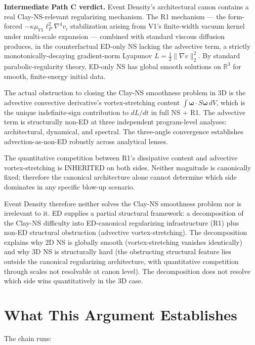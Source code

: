 \documentclass[11pt,a4paper]{article}
\begin{document}
\textbf{Intermediate Path C verdict.} Event Density's architectural canon contains a real Clay-NS-relevant regularizing mechanism. The R1 mechanism --- the form-forced $-\kappa\mu_{V1}\ell_P^2\nabla^4 v_i$ stabilization arising from V1's finite-width vacuum kernel under multi-scale expansion --- combined with standard viscous diffusion produces, in the counterfactual ED-only NS lacking the advective term, a strictly monotonically-decaying gradient-norm Lyapunov $L = \tfrac{1}{2}\|\nabla v\|^2_2$. By standard parabolic-regularity theory, ED-only NS has global smooth solutions on $\mathbb{R}^3$ for smooth, finite-energy initial data.

The actual obstruction to closing the Clay-NS smoothness problem in 3D is the advective convective derivative's vortex-stretching content $\int\boldsymbol{\omega}\cdot S\boldsymbol{\omega}\, dV$, which is the unique indefinite-sign contribution to $dL/dt$ in full NS + R1. The advective term is structurally non-ED at three independent program-level analyses: architectural, dynamical, and spectral. The three-angle convergence establishes advection-as-non-ED robustly across analytical lenses.

The quantitative competition between R1's dissipative content and advective vortex-stretching is INHERITED on both sides. Neither magnitude is canonically fixed; therefore the canonical architecture alone cannot determine which side dominates in any specific blow-up scenario.

Event Density therefore neither solves the Clay-NS smoothness problem nor is irrelevant to it. ED supplies a partial structural framework: a decomposition of the Clay-NS difficulty into ED-canonical regularizing infrastructure (R1) plus non-ED structural obstruction (advective vortex-stretching). The decomposition explains why 2D NS is globally smooth (vortex-stretching vanishes identically) and why 3D NS is structurally hard (the obstructing structural feature lies outside the canonical regularizing architecture, with quantitative competition through scales not resolvable at canon level). The decomposition does not resolve which side wins quantitatively in the 3D case.

\section{What This Argument Establishes}

The chain runs:
\end{document}
